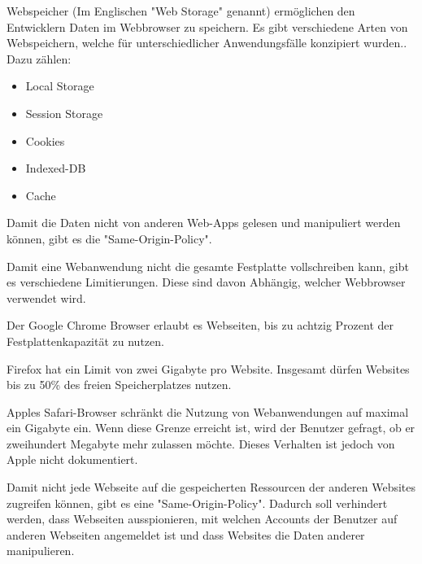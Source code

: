 

Webspeicher (Im Englischen "Web Storage" genannt) ermöglichen den Entwicklern %
Daten im Webbrowser zu speichern.
Es gibt verschiedene Arten von Webspeichern, welche für unterschiedlicher Anwendungsfälle konzipiert wurden.. Dazu zählen:

\begin{itemize}
    \item Local Storage
    \item Session Storage
    \item Cookies
    \item Indexed-DB
    \item Cache
\end{itemize}

Damit die Daten nicht von anderen Web-Apps gelesen und manipuliert werden können, gibt es die "Same-Origin-Policy".


Damit eine Webanwendung nicht die gesamte Festplatte vollschreiben kann, gibt es verschiedene Limitierungen. Diese sind davon Abhängig, welcher Webbrowser verwendet wird.

Der Google Chrome Browser erlaubt es Webseiten, bis zu achtzig Prozent der Festplattenkapazität zu nutzen.

Firefox hat ein Limit von zwei Gigabyte pro Website. Insgesamt dürfen Websites bis zu 50\% des freien Speicherplatzes nutzen.

Apples Safari-Browser schränkt die Nutzung von Webanwendungen auf maximal ein Gigabyte ein. Wenn diese Grenze erreicht ist, wird der Benutzer gefragt, ob er zweihundert Megabyte mehr zulassen möchte. Dieses Verhalten ist jedoch von Apple nicht dokumentiert. \cite{WebDevStorage}


Damit nicht jede Webseite auf die gespeicherten Ressourcen der anderen Websites zugreifen können, gibt es eine "Same-Origin-Policy". Dadurch soll verhindert werden, dass Webseiten ausspionieren, mit welchen Accounts der Benutzer auf anderen Webseiten angemeldet ist und dass Websites die Daten anderer manipulieren.

